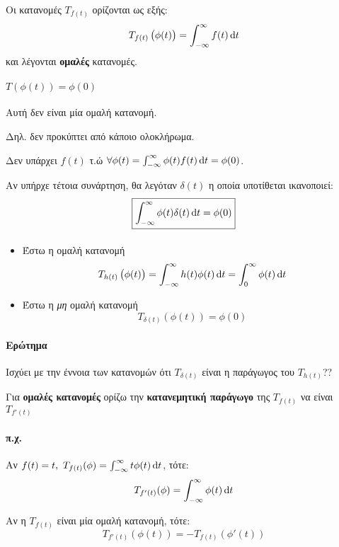 \documentclass[11pt,a4paper,titlepage,draft]{article}
\begin{document}
\begin{defn}{}{}
Οι κατανομές \( T_{f(t)} \) ορίζονται ως εξής:
\[
T_{f(t)}\left( \phi(t) \right) = \int_{-\infty}^\infty f(t) \dif t
\]
και λέγονται \textbf{ομαλές} κατανομές.
\end{defn}
\paragraph{\( T\left( \phi(t) \right) = \phi(0) \)}
Αυτή δεν είναι μία ομαλή κατανομή.

Δηλ. δεν προκύπτει από κάποιο ολοκλήρωμα.

Δεν υπάρχει \( f(t) \) τ.ώ \( \forall \phi(t) = \int_{-\infty}^\infty \phi(t)f(t)\dif t =\phi(0) \).

Αν υπήρχε τέτοια συνάρτηση, θα λεγόταν \( \delta(t) \) η οποία υποτίθεται ικανοποιεί:
\[
\boxed{
\int_{-\infty}^\infty \phi(t)\delta(t)\dif t = \phi(0)
}
\]

\paragraph{}

\begin{itemize}
\item Έστω η ομαλή κατανομή \[
T_{h(t)}\left(\phi(t) \right)  = \int_{-\infty}^\infty h(t)\phi(t)\dif t = \int_0^\infty \phi(t)\dif t
\]
\item Έστω η \textit{μη} ομαλή κατανομή \[
T_{\delta(t)} \left(\phi(t) \right) = \phi(0)
\]
\end{itemize}
\paragraph{Ερώτημα} Ισχύει με την έννοια των κατανομών ότι \( T_{\delta(t)} \) είναι η παράγωγος του \( T_{h(t)} \)??

\begin{defn}{}{}
Για \textbf{ομαλές κατανομές} ορίζω την \textbf{κατανεμητική παράγωγο} της \( T_{f(t)} \) να είναι \( T_{f'(t)} \)
\end{defn}
\paragraph{π.χ.} Αν \( f(t)=t,\ T_{f(t)}(\phi) = \int_{-\infty}^\infty t\phi(t)\dif t \), τότε:
\[
T_{f'(t)}(\phi) = \int_{-\infty}^\infty \phi(t)\dif t
\]

\begin{theorem}{}{}
Αν η \( T_{f(t)} \) είναι μία ομαλή κατανομή, τότε:
\[
T_{f'(t)}\left(\phi(t)\right) = -T_{f(t)}\left(\phi'(t) \right)
\]
\end{theorem}
\end{document}
